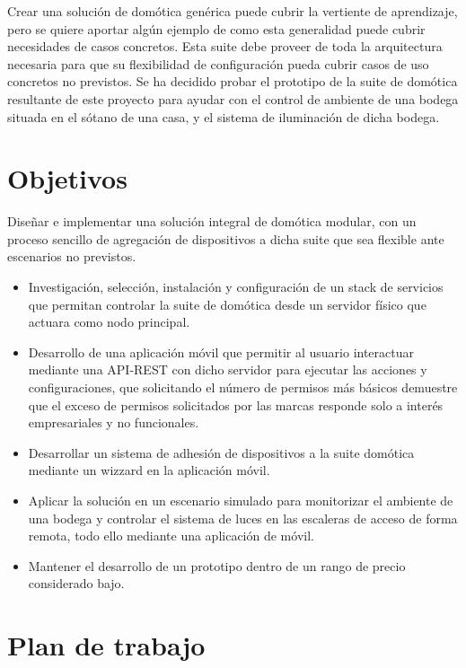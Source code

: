 \vspace{1cm}

Crear una solución de domótica genérica puede cubrir la vertiente de aprendizaje, pero se quiere aportar algún ejemplo de como esta generalidad puede cubrir necesidades de casos concretos. Esta suite debe proveer de toda la arquitectura necesaria para que su flexibilidad de configuración pueda cubrir casos de uso concretos no previstos. Se ha decidido probar el prototipo de la suite de domótica resultante de este proyecto para ayudar con el control de ambiente de una bodega situada en el sótano de una casa, y el sistema de iluminación de dicha bodega.

\section{Objetivos}
\label{ch:Capitulo1.1}

Diseñar e implementar una solución integral de domótica modular, con un proceso sencillo de agregación de dispositivos a dicha suite que sea flexible ante escenarios no previstos.
\begin{itemize}
  \item Investigación, selección, instalación y configuración de un stack de servicios que permitan controlar la suite de domótica desde un servidor físico que actuara como nodo principal.

  \item Desarrollo de una aplicación móvil que permitir al usuario interactuar mediante una API-REST con dicho servidor para ejecutar las acciones y configuraciones, que solicitando el número de permisos más básicos demuestre que el exceso de permisos solicitados por las marcas responde solo a interés empresariales y no funcionales.

  \item Desarrollar un sistema de adhesión de dispositivos a la suite domótica mediante un \gls{wizzard} en la aplicación móvil.
  
  \item Aplicar la solución en un escenario simulado para monitorizar el ambiente de una bodega y controlar el sistema de luces en las escaleras de acceso de forma remota, todo ello mediante una aplicación de móvil.
  
  \item Mantener el desarrollo de un prototipo dentro de un rango de precio considerado bajo.
\end{itemize}

\section{Plan de trabajo}
\label{ch:Capitulo1.2}

